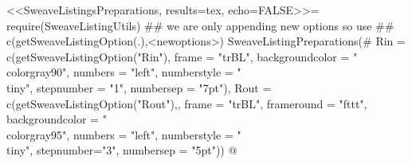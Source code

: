 \RequirePackage{fancyvrb}
\RequirePackage{listings}
<<SweaveListingsPreparations, results=tex, echo=FALSE>>=
require(SweaveListingUtils)
 ## we are only appending new options so use 
 ## c(getSweaveListingOption(.),<newoptions>)
SweaveListingPreparations(#
        Rin = c(getSweaveListingOption("Rin"),
                frame = "trBL", 
                backgroundcolor = "\\color{gray90}",%
                numbers = "left", 
                numberstyle = "\\tiny",
                stepnumber = "1",
                numbersep = "7pt"),
        Rout = c(getSweaveListingOption("Rout"),,
                 frame = "trBL", 
                 frameround = "fttt", 
                 backgroundcolor = "\\color{gray95}",%
                 numbers = "left", 
                 numberstyle = "\\tiny",
                 stepnumber="3",
                 numbersep = "5pt"))
@
